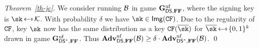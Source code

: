 \begin{proof}[Theorem~\ref{th-jc}] We consider running $\mathcal{B}$ in game $\mathbf{G}^{\mathrm{uf}}_{\mathsf{DS},\mathbf{FF}}$, where the signing key is $\sk\getsr\keySet$. With probability $\delta$ we have $\sk\in \Img(\CFEDSA)$. Due to the regularity of $\mathtt{CF}$, key $\sk$ now has the same distribution as a key $\CFEDSA(\osk)$ for $\osk\getsr\bits^k$ drawn in game $\mathbf{G}^{\mathrm{uf}}_{\mathsf{DS}^*,\mathbf{FF}}$. Thus $\mathbf{Adv}^{\mathrm{uf}}_{\mathsf{DS},\mathbf{FF}}(\mathcal{B}) \geq \delta\cdot \mathbf{Adv}^{\mathrm{uf}}_{\mathsf{DS}^*,\mathbf{FF}}(\mathcal{B})$. \qed  
\end{proof}

